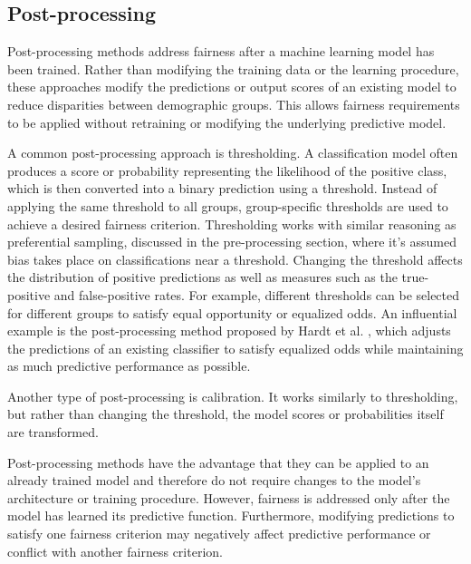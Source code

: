 \subsection{Post-processing}
Post-processing methods address fairness after a machine learning model has been trained. Rather than modifying the training data or the learning procedure, these approaches modify the predictions or output scores of an existing model to reduce disparities between demographic groups. This allows fairness requirements to be applied without retraining or modifying the underlying predictive model.

A common post-processing approach is thresholding. A classification model often produces a score or probability representing the likelihood of the positive class, which is then converted into a binary prediction using a threshold. Instead of applying the same threshold to all groups, group-specific thresholds are used to achieve a desired fairness criterion. Thresholding works with similar reasoning as preferential sampling, discussed in the pre-processing section, where it's assumed bias takes place on classifications near a threshold. Changing the threshold affects the distribution of positive predictions as well as measures such as the true-positive and false-positive rates. For example, different thresholds can be selected for different groups to satisfy equal opportunity or equalized odds. An influential example is the post-processing method proposed by Hardt et al. \cite{hardt2016}, which adjusts the predictions of an existing classifier to satisfy equalized odds while maintaining as much predictive performance as possible.

Another type of post-processing is calibration. It works similarly to thresholding, but rather than changing the threshold, the model scores or probabilities itself are transformed.

Post-processing methods have the advantage that they can be applied to an already trained model and therefore do not require changes to the model's architecture or training procedure. However, fairness is addressed only after the model has learned its predictive function. Furthermore, modifying predictions to satisfy one fairness criterion may negatively affect predictive performance or conflict with another fairness criterion.

